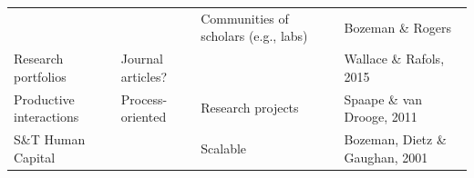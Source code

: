\documentclass[]{article}
\begin{document}
\begin{longtable}[]{@{}llll@{}}
\begin{minipage}[t]{0.23\columnwidth}
\end{minipage} & \begin{minipage}[t]{0.22\columnwidth}\raggedright\strut
\strut
\end{minipage} & \begin{minipage}[t]{0.25\columnwidth}\raggedright\strut
Communities of scholars (e.g., labs)\strut
\end{minipage} & \begin{minipage}[t]{0.16\columnwidth}\raggedright\strut
Bozeman \& Rogers\strut
\end{minipage}\tabularnewline
\begin{minipage}[t]{0.23\columnwidth}\raggedright\strut
Research portfolios\strut
\end{minipage} & \begin{minipage}[t]{0.22\columnwidth}\raggedright\strut
Journal articles?\strut
\end{minipage} & \begin{minipage}[t]{0.25\columnwidth}\raggedright\strut
\strut
\end{minipage} & \begin{minipage}[t]{0.16\columnwidth}\raggedright\strut
Wallace \& Rafols, 2015\strut
\end{minipage}\tabularnewline
\begin{minipage}[t]{0.23\columnwidth}\raggedright\strut
Productive interactions\strut
\end{minipage} & \begin{minipage}[t]{0.22\columnwidth}\raggedright\strut
Process-oriented\strut
\end{minipage} & \begin{minipage}[t]{0.25\columnwidth}\raggedright\strut
Research projects\strut
\end{minipage} & \begin{minipage}[t]{0.16\columnwidth}\raggedright\strut
Spaape \& van Drooge, 2011\strut
\end{minipage}\tabularnewline
\begin{minipage}[t]{0.23\columnwidth}\raggedright\strut
S\&T Human Capital\strut
\end{minipage} & \begin{minipage}[t]{0.22\columnwidth}\raggedright\strut
\strut
\end{minipage} & \begin{minipage}[t]{0.25\columnwidth}\raggedright\strut
Scalable\strut
\end{minipage} & \begin{minipage}[t]{0.16\columnwidth}\raggedright\strut
Bozeman, Dietz \& Gaughan, 2001\strut
\end{minipage}\tabularnewline
\bottomrule
\end{longtable}
\end{document}
